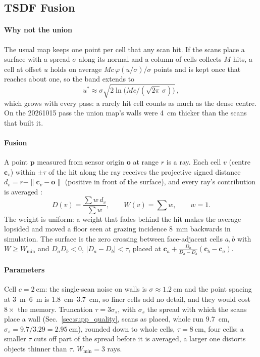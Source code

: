 \subsection{TSDF Fusion}
\paragraph{Why not the union} The usual map keeps one point per cell that
any scan hit. If the scans place a surface with a spread $\sigma$ along its
normal and a column of cells collects $M$ hits, a cell at offset $u$ holds
on average $M c\,\varphi(u/\sigma)/\sigma$ points and is kept once that
reaches about one, so the band extends to
\begin{equation}
u^\ast\approx\sigma\sqrt{2\ln\!\big(Mc/(\sqrt{2\pi}\,\sigma)\big)}\, ,
\end{equation}
which grows with every pass: a rarely hit cell counts as much as the dense
centre. On the 20261015 pass the union map's walls were
\SI{4}{\centi\metre} thicker than the scans that built it.

\paragraph{Fusion} A point $\mathbf p$ measured from sensor origin
$\mathbf o$ at range $r$ is a ray. Each cell $v$ (centre $\mathbf c_v$)
within $\pm\tau$ of the hit along the ray receives the projective signed
distance $d_v=r-\|\mathbf c_v-\mathbf o\|$ (positive in front of the
surface), and every ray's contribution is averaged
\cite{curless1996,vdbfusion}:
\begin{equation}
D(v)=\frac{\sum w\,d_v}{\sum w},\qquad W(v)=\sum w,\qquad w=1 .
\end{equation}
The weight is uniform: a weight that fades behind the hit makes the average
lopsided and moved a floor seen at grazing incidence \SI{8}{\milli\metre}
backwards in simulation. The surface is the zero crossing between
face-adjacent cells $a,b$ with $W\ge W_{\min}$ and $D_aD_b<0$,
$|D_a-D_b|<\tau$, placed at
$\mathbf c_a+\tfrac{D_a}{D_a-D_b}(\mathbf c_b-\mathbf c_a)$.

\paragraph{Parameters} Cell $c=\SI{2}{\centi\metre}$: the single-scan noise
on walls is $\sigma\approx\SI{1.2}{\centi\metre}$ and the point spacing at
\SIrange{3}{6}{\metre} is \SIrange{1.8}{3.7}{\centi\metre}, so finer cells
add no detail, and they would cost $8\times$ the memory. Truncation
$\tau=3\sigma_s$, with $\sigma_s$ the spread with which the scans place a
wall (Sec.~\ref{sec:supp_quality}, scans as placed, whole run
\SI{9.7}{\centi\metre}, $\sigma_s=9.7/3.29=\SI{2.95}{\centi\metre}$),
rounded down to whole cells, $\tau=\SI{8}{\centi\metre}$, four cells: a smaller
$\tau$ cuts off part of the spread before it is averaged, a larger one
distorts objects thinner than $\tau$. $W_{\min}=3$ rays.

